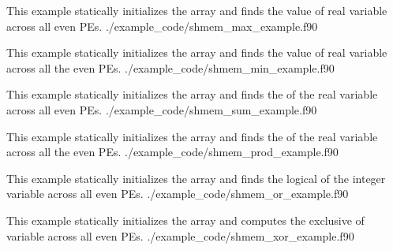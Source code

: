 \begin{apidefinition}
\begin{apiexamples}
\apifexample
    {This \Fortran example statically initializes the  array and finds
    the  value of real variable  across all even \acp{PE}.}
    {./example_code/shmem_max_example.f90}
    {}

\apifexample
    { This \Fortran example statically initializes the  array and finds
    the  value of real variable  across all the even
    \acp{PE}.}
    {./example_code/shmem_min_example.f90}
    {}

\apifexample
    {This \Fortran example statically initializes the  array and finds
    the  of the real variable  across all even \acp{PE}.}
    {./example_code/shmem_sum_example.f90}
    {}

\apifexample
    {This \Fortran example statically initializes the  array and finds
    the  of the real variable  across all the even \acp{PE}.}
    {./example_code/shmem_prod_example.f90}
    {}

\apifexample
    {This \Fortran example statically initializes the  array and finds
    the logical  of the integer variable  across all even
    \acp{PE}.}
    {./example_code/shmem_or_example.f90}
    {}

\apifexample
    {This \Fortran example statically initializes the  array and
    computes the exclusive  of variable  across all even
    \acp{PE}.}
    {./example_code/shmem_xor_example.f90}
    {}

\end{apiexamples}

\end{apidefinition}
